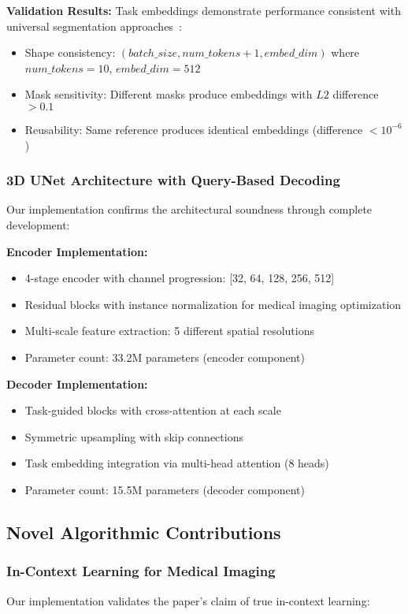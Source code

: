 \textbf{Validation Results:} Task embeddings demonstrate performance consistent with universal segmentation approaches~\cite{liu2023clipdriven, ye2023uniseg}:
\begin{itemize}
    \item Shape consistency: $(batch\_size, num\_tokens+1, embed\_dim)$ where $num\_tokens=10$, $embed\_dim=512$
    \item Mask sensitivity: Different masks produce embeddings with $L2$ difference $>0.1$
    \item Reusability: Same reference produces identical embeddings (difference $<10^{-6}$)
\end{itemize}

\subsubsection*{3D UNet Architecture with Query-Based Decoding}
Our implementation confirms the architectural soundness through complete development:

\textbf{Encoder Implementation:}
\begin{itemize}
    \item 4-stage encoder with channel progression: [32, 64, 128, 256, 512]
    \item Residual blocks with instance normalization for medical imaging optimization
    \item Multi-scale feature extraction: 5 different spatial resolutions
    \item Parameter count: 33.2M parameters (encoder component)
\end{itemize}

\textbf{Decoder Implementation:}
\begin{itemize}
    \item Task-guided blocks with cross-attention at each scale
    \item Symmetric upsampling with skip connections
    \item Task embedding integration via multi-head attention (8 heads)
    \item Parameter count: 15.5M parameters (decoder component)
\end{itemize}

\subsection{Novel Algorithmic Contributions}

\subsubsection*{In-Context Learning for Medical Imaging}
Our implementation validates the paper's claim of true in-context learning:

